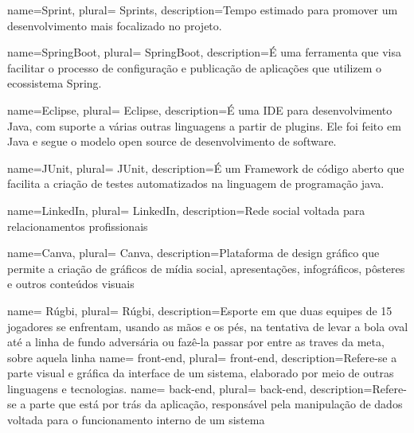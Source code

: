 


 {
    name=Sprint,
    plural= {Sprints},
    description={Tempo estimado para promover um desenvolvimento mais focalizado no projeto.}
}

 {
    name=SpringBoot,
    plural= {SpringBoot},
    description={É uma ferramenta que visa facilitar o processo de configuração e publicação de aplicações que utilizem o ecossistema Spring.}
}

 {
    name=Eclipse,
    plural= {Eclipse},
    description={É uma IDE para desenvolvimento Java, com suporte a várias outras linguagens a partir de plugins. Ele foi feito em Java e segue o modelo open source de desenvolvimento de software.}
}

 {
    name=JUnit,
    plural= {JUnit},
    description={É um Framework de código aberto que facilita a criação de testes automatizados na linguagem de programação java.}
}


 {
    name=LinkedIn,
    plural= {LinkedIn},
    description={Rede social voltada para relacionamentos profissionais}
}

 {
    name=Canva,
    plural= {Canva},
    description={Plataforma de design gráfico que permite a criação de gráficos de mídia social, apresentações, infográficos, pôsteres e outros conteúdos visuais}
}

 {
    name= R{\'u}gbi,
    plural= {R{\'u}gbi},
    description={Esporte em que duas equipes de 15 jogadores se enfrentam, usando as mãos e os pés, na tentativa de levar a bola oval at{\'e} a linha de fundo adversária ou faz{\^e}-la passar por entre as traves da meta, sobre aquela linha }
}
 {
    name= front-end,
    plural= {front-end},
    description={Refere-se a parte visual e gráfica da interface de um sistema, elaborado por meio de outras linguagens e tecnologias.}
}
 {
    name= back-end,
    plural= {back-end},
    description={Refere-se a parte que está por trás da aplicação, responsável pela manipulação de dados voltada para o funcionamento interno de um sistema}
}

